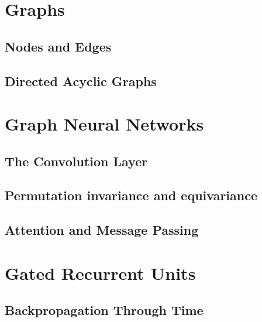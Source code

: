 \section{Graphs}
\subsection{Nodes and Edges}
\subsection{Directed Acyclic Graphs}




\section{Graph Neural Networks}
\subsection{The Convolution Layer}
\subsection{Permutation invariance and equivariance}
\subsection{Attention and Message Passing}




\section{Gated Recurrent Units}
\subsection{Backpropagation Through Time}